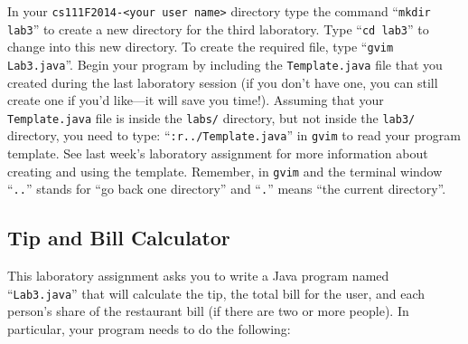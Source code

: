 In your {\tt cs111F2014-<your user name>} directory type the command ``{\tt mkdir lab3}'' to create a new directory for
the third laboratory.  \noindent Type ``{\tt cd lab3}'' to change into this new directory.  To create the required file,
type ``{\tt gvim Lab3.java}''. Begin your program by including the {\tt Template.java} file that you created during
the last laboratory session (if you don't have one, you can still create one if you'd like---it will save you time!).
Assuming that your {\tt Template.java} file is inside the {\tt labs/} directory, but not inside the {\tt lab3/}
directory, you need to type: ``{\tt :r../Template.java}'' in {\tt gvim} to read your program template.  See last week's
laboratory assignment for more information about creating and using the template. Remember, in {\tt gvim} and the
terminal window ``{\tt ..}'' stands for ``go back one directory'' and ``{\tt .}'' means ``the current directory''.

\vspace{-0.15in}
\subsection*{Tip and Bill Calculator}

This laboratory assignment asks you to write a Java program named ``{\tt Lab3.java}'' that will calculate the tip, the
total bill for the user, and each person's share of the restaurant bill (if there are two or more people). In
particular, your program needs to do the following:

